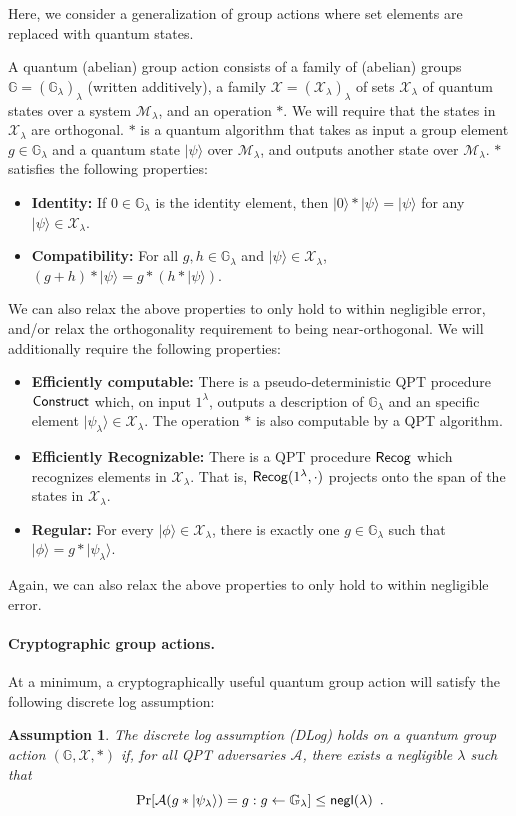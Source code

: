 \documentclass{article}\usepackage[a4paper,margin=20mm]{geometry}
\newtheorem{assumption}[theorem]{Assumption}
\numberwithin{theorem}{section}
\numberwithin{equation}{section}
\newcommand{\G}{\mathbb{G}}
\newcommand{\As}{{\mathcal{A}}}
\newcommand{\Ms}{{\mathcal{M}}}
\newcommand{\Xs}{{\mathcal{X}}}
\newcommand{\negl}{{\sf negl}}
\begin{document}
Here, we consider a generalization of group actions where set elements are replaced with quantum states.

A quantum (abelian) group action consists of a family of (abelian) groups $\G=(\G_\lambda)_\lambda$ (written additively), a family $\Xs=(\Xs_\lambda)_\lambda$ of sets $\Xs_\lambda$ of quantum states over a system $\Ms_\lambda$, and an operation $*$. We will require that the states in $\Xs_\lambda$ are orthogonal. $*$ is a quantum algorithm that takes as input a group element $g\in\G_\lambda$ and a quantum state $|\psi\rangle$ over $\Ms_\lambda$, and outputs another state over $\Ms_\lambda$. $*$ satisfies the following properties:
\begin{itemize}
	\item {\bf Identity:} If $0\in \G_\lambda$ is the identity element, then $|0\rangle*|\psi\rangle=|\psi\rangle$ for any $|\psi\rangle\in \Xs_\lambda$.
	\item {\bf Compatibility:} For all $g,h\in \G_\lambda$ and $|\psi\rangle\in \Xs_\lambda$, $(g+h)*|\psi\rangle=g*(h*|\psi\rangle)$.
\end{itemize}
We can also relax the above properties to only hold to within negligible error, and/or relax the orthogonality requirement to being near-orthogonal. We will additionally require the following properties:
\begin{itemize}
	\item {\bf Efficiently computable:} There is a pseudo-deterministic QPT procedure ${\sf Construct}$ which, on input $1^\lambda$, outputs a description of $\G_\lambda$ and an specific element $|\psi_\lambda\rangle\in\Xs_\lambda$. The operation $*$ is also computable by a QPT algorithm.
	\item {\bf Efficiently Recognizable:} There is a QPT procedure ${\sf Recog}$ which recognizes elements in $\Xs_\lambda$. That is, ${\sf Recog}(1^\lambda,\cdot)$ projects onto the span of the states in $\Xs_\lambda$.
	\item {\bf Regular:} For every $|\phi\rangle\in\Xs_\lambda$, there is exactly one $g\in\G_\lambda$ such that $|\phi\rangle=g*|\psi_\lambda\rangle$. 
\end{itemize}
Again, we can also relax the above properties to only hold to within negligible error.

\paragraph{Cryptographic group actions.} At a minimum, a cryptographically useful quantum group action will satisfy the following discrete log assumption:
\begin{assumption}\label{def:qdlog} The \emph{discrete log assumption} (DLog) holds on a quantum group action $(\G,\Xs,*)$ if, for all QPT adversaries $\As$, there exists a negligible $\lambda$ such that 
	\[\Pr[\As(g*|\psi_\lambda\rangle)=g:g\gets\G_\lambda]\leq\negl(\lambda)\enspace .\]
\end{assumption}
\end{document}
